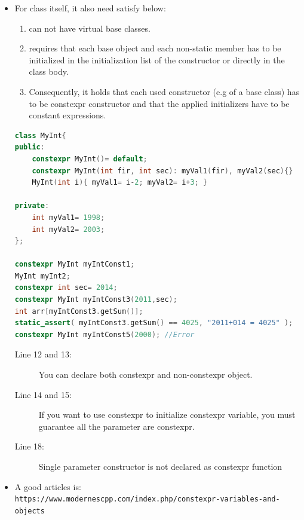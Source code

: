 \documentclass[a4paper,11pt,twoside]{book}
\begin{document}
\begin{itemize}
	\item For class itself, it also need satisfy below:
	\begin{enumerate}
		\item can not have virtual base classes.
		\item requires that each base object and each non-static member has to be initialized in the initialization list of the constructor or directly in the class body. 
		\item Consequently, it holds that each used constructor (e.g of a base class) has to be constexpr constructor and that the applied initializers have to be constant expressions.
	\end{enumerate}

\begin{lstlisting}[frame=single, language=c++]
class MyInt{
public:
	constexpr MyInt()= default;
	constexpr MyInt(int fir, int sec): myVal1(fir), myVal2(sec){}
	MyInt(int i){ myVal1= i-2; myVal2= i+3; }
	
private:
	int myVal1= 1998;
	int myVal2= 2003;
};
	
constexpr MyInt myIntConst1;
MyInt myInt2;
constexpr int sec= 2014;
constexpr MyInt myIntConst3(2011,sec);
int arr[myIntConst3.getSum()];
static_assert( myIntConst3.getSum() == 4025, "2011+014 = 4025" );
constexpr MyInt myIntConst5(2000); //Error
\end{lstlisting}
\begin{description}
	\item[Line 12 and 13:] You can declare both constexpr and non-constexpr object.
	
	\item[Line 14 and 15:] If you want to use constexpr to initialize constexpr variable, you must guarantee all the parameter are constexpr.
	
	\item[Line 18:] Single parameter constructor is not declared as constexpr function
\end{description}
	\item A good articles is: \\ \verb|https://www.modernescpp.com/index.php/constexpr-variables-and-objects|
	
\end{itemize}
\end{document}
